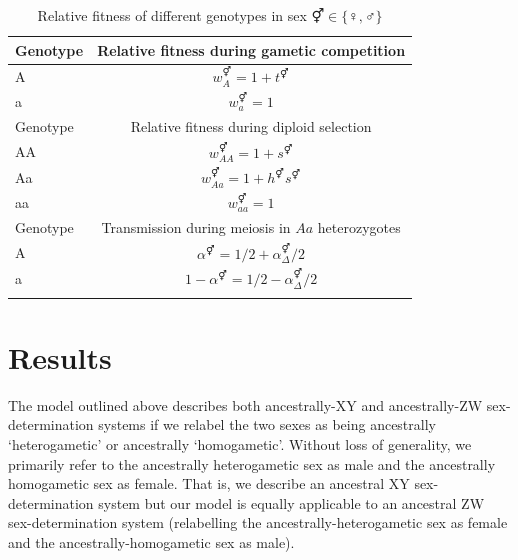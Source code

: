\documentclass[12pt]{article}
\begin{document}
\begin{table}[ht]
\centering
\smallskip
\caption{Relative fitness of different genotypes in sex $\Hermaphrodite \in \{\female,\male\}$}
\begin{tabular}{l c }
\hline\hline
  Genotype & Relative fitness during gametic competition \\ [0.5ex] \hline
  A & $w_{A}^\Hermaphrodite = 1+t^\Hermaphrodite$ \\
  a & $w_{a}^\Hermaphrodite = 1$ \\ [0.5ex] \hline
  Genotype & Relative fitness during diploid selection \\ [0.5ex] \hline
  AA & $w_{AA}^\Hermaphrodite = 1+ s^\Hermaphrodite$ \\
  Aa & $w_{Aa}^\Hermaphrodite = 1+h^\Hermaphrodite s^\Hermaphrodite$ \\
  aa & $w_{aa}^\Hermaphrodite = 1$ \\ [0.5ex] \hline
  Genotype & Transmission during meiosis in $Aa$ heterozygotes \\ [0.5ex] \hline
  A & $\alpha^\Hermaphrodite=1/2+\alpha_{\Delta}^{\Hermaphrodite}/2$ \\
  a & $1-\alpha^\Hermaphrodite=1/2-\alpha_{\Delta}^{\Hermaphrodite}/2$ \\
  \hline \hline
  \label{tab:fitnesstable}
 \end{tabular}
\end{table}


\section*{Results}

The model outlined above describes both ancestrally-XY and ancestrally-ZW sex-determination systems if we relabel the two sexes as being ancestrally `heterogametic' or ancestrally `homogametic'. 
Without loss of generality, we primarily refer to the ancestrally heterogametic sex as male and the ancestrally homogametic sex as female.
That is, we describe an ancestral XY sex-determination system but our model is equally applicable to an ancestral ZW sex-determination system (relabelling the ancestrally-heterogametic sex as female and the ancestrally-homogametic sex as male). 
\end{document}
